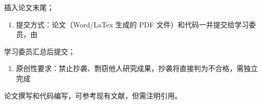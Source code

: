 \documentclass[
]{article}
\providecommand{\tightlist}{%
  \setlength{\itemsep}{0pt}\setlength{\parskip}{0pt}}
\begin{document}
插入论文末尾；

\begin{enumerate}
\def\labelenumi{\arabic{enumi}.}
\setcounter{enumi}{2}
\tightlist
\item
  提交方式：论文（Word/LaTex 生成的 PDF
  文件）和代码一并提交给学习委员，由
\end{enumerate}

学习委员汇总后提交；

\begin{enumerate}
\def\labelenumi{\arabic{enumi}.}
\setcounter{enumi}{3}
\tightlist
\item
  原创性要求：禁止抄袭、剽窃他人研究成果，抄袭将直接判为不合格，需独立完成
\end{enumerate}

论文撰写和代码编写，可参考现有文献，但需注明引用。
\end{document}

